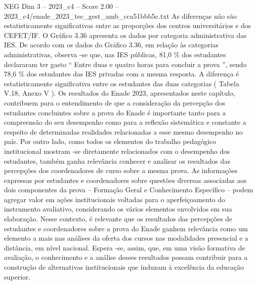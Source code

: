 \begin{textsample}{NEG Dim 3 – 2023\_c4 – Score 2.00 – 2023\_c4/enade\_2023\_tec\_gest\_amb\_cca51bbb5c.txt}
As diferenças não são estatisticamente significativas entre as proporções dos centros universitários e dos CEFET/IF.
O Gráfico 3.36 apresenta os dados por categoria administrativa das IES.
De acordo com os dados do Gráfico 3.36, em relação às categorias administrativas, observa -se que, nas IES públicas, 81,0 \% dos estudantes declararam ter gasto “ Entre duas e quatro horas para concluir a prova ”, sendo 78,6 \% dos estudantes das IES privadas com a mesma resposta.
A diferença é estatisticamente significativa entre os estudantes das duas categorias ( Tabela V.18, Anexo V ).
Os resultados do Enade 2023, apresentados neste capítulo, contribuem para o entendimento de que a consideração da percepção dos estudantes concluintes sobre a prova do Enade é importante tanto para a compreensão do seu desempenho como para a reflexão sistemática e constante a respeito de determinadas realidades relacionadas a esse mesmo desempenho no país.
Por outro lado, como todos os elementos do trabalho pedagógico institucional mostram -se diretamente relacionados com o desempenho dos estudantes, também ganha relevância conhecer e analisar os resultados das percepções dos coordenadores de curso sobre a mesma prova.
As informações expressas por estudantes e coordenadores sobre questões diversas associadas aos dois componentes da prova – Formação Geral e Conhecimento Específico – podem agregar valor em ações institucionais voltadas para o aperfeiçoamento do instrumento avaliativo, considerando os vários elementos envolvidos em sua elaboração.
Nesse contexto, é relevante que os resultados das percepções de estudantes e coordenadores sobre a prova do Enade ganhem relevância como um elemento a mais nas análises da oferta dos cursos nas modalidades presencial e a distância, em nível nacional.
Espera -se, assim, que, em uma visão formativa de avaliação, o conhecimento e a análise desses resultados possam contribuir para a construção de alternativas institucionais que induzam à excelência da educação superior.

\end{textsample}
